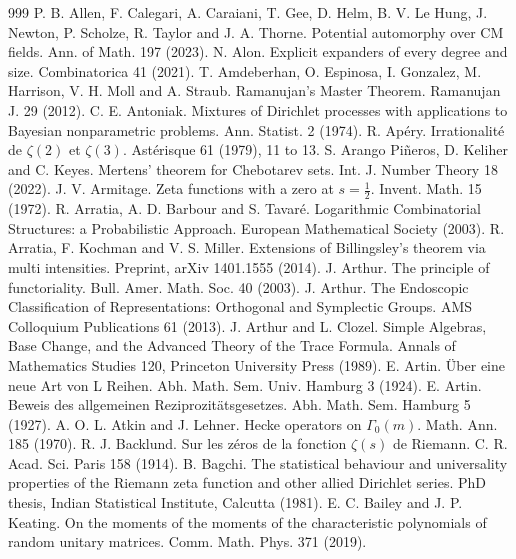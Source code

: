 \begin{thebibliography}{999}
 P. B. Allen, F. Calegari, A. Caraiani, T. Gee, D. Helm, B. V. Le Hung, J. Newton, P. Scholze, R. Taylor and J. A. Thorne. Potential automorphy over CM fields. Ann. of Math. 197 (2023).
 N. Alon. Explicit expanders of every degree and size. Combinatorica 41 (2021).
 T. Amdeberhan, O. Espinosa, I. Gonzalez, M. Harrison, V. H. Moll and A. Straub. Ramanujan's Master Theorem. Ramanujan J. 29 (2012).
 C. E. Antoniak. Mixtures of Dirichlet processes with applications to Bayesian nonparametric problems. Ann. Statist. 2 (1974).
 R. Ap\'ery. Irrationalit\'e de $\zeta(2)$ et $\zeta(3)$. Ast\'erisque 61 (1979), 11 to 13.
 S. Arango Pi\~neros, D. Keliher and C. Keyes. Mertens' theorem for Chebotarev sets. Int. J. Number Theory 18 (2022).
 J. V. Armitage. Zeta functions with a zero at $s=\frac12$. Invent. Math. 15 (1972).
 R. Arratia, A. D. Barbour and S. Tavar\'e. Logarithmic Combinatorial Structures: a Probabilistic Approach. European Mathematical Society (2003).
 R. Arratia, F. Kochman and V. S. Miller. Extensions of Billingsley's theorem via multi intensities. Preprint, arXiv 1401.1555 (2014).
 J. Arthur. The principle of functoriality. Bull. Amer. Math. Soc. 40 (2003).
 J. Arthur. The Endoscopic Classification of Representations: Orthogonal and Symplectic Groups. AMS Colloquium Publications 61 (2013).
 J. Arthur and L. Clozel. Simple Algebras, Base Change, and the Advanced Theory of the Trace Formula. Annals of Mathematics Studies 120, Princeton University Press (1989).
 E. Artin. \"Uber eine neue Art von L Reihen. Abh. Math. Sem. Univ. Hamburg 3 (1924).
 E. Artin. Beweis des allgemeinen Reziprozit\"atsgesetzes. Abh. Math. Sem. Hamburg 5 (1927).
 A. O. L. Atkin and J. Lehner. Hecke operators on $\Gamma_0(m)$. Math. Ann. 185 (1970).
 R. J. Backlund. Sur les z\'eros de la fonction $\zeta(s)$ de Riemann. C. R. Acad. Sci. Paris 158 (1914).
 B. Bagchi. The statistical behaviour and universality properties of the Riemann zeta function and other allied Dirichlet series. PhD thesis, Indian Statistical Institute, Calcutta (1981).
 E. C. Bailey and J. P. Keating. On the moments of the moments of the characteristic polynomials of random unitary matrices. Comm. Math. Phys. 371 (2019).

\end{thebibliography}
